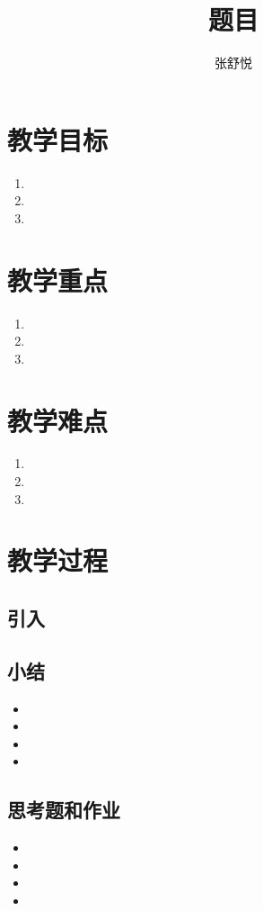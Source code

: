 \documentclass{article}
\begin{document}
\begin{CJK}{UTF8}{gkai}

\title{题目}
\date{}
\author{张舒悦}
\maketitle

\section{教学目标}
\begin{enumerate}
\item 
\item 
\item 
\end{enumerate}


\section{教学重点}
\begin{enumerate}
\item 
\item 
\item 
\end{enumerate}



\section{教学难点}
\begin{enumerate}
\item 
\item 
\item 
\end{enumerate}

\section{教学过程}

\subsection{引入}

\subsection{}

\subsection{小结}
\begin{itemize}
\item
\item
\item
\item 
\end{itemize}

\subsection{思考题和作业}
\begin{itemize}
\item
\item
\item
\item 
\end{itemize}


\end{CJK}
\end{document}
